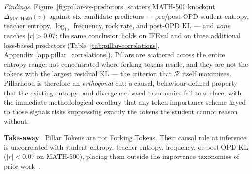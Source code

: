 \emph{Findings.} Figure~\ref{fig:pillar-vs-predictors} scatters MATH-500 knockout $\Delta_{\mathrm{MATH500}}(v)$ against six candidate predictors --- pre/post-OPD student entropy, teacher entropy, $\log_{10}$ frequency, rock rate, and post-OPD KL --- and \emph{none} reaches $|r|>0.07$; the same conclusion holds on IFEval and on three additional loss-based predictors (Table~\ref{tab:pillar-correlations}, Appendix~\ref{app:pillar_correlations}). Pillars are scattered across the entire entropy range, not concentrated where forking tokens reside, and they are not the tokens with the largest residual KL --- the criterion that $\mathcal{R}$ itself maximizes. Pillarhood is therefore an \emph{orthogonal} cut: a causal, behaviour-defined property that the existing entropy- and divergence-based taxonomies fail to surface, with the immediate methodological corollary that any token-importance scheme keyed to those signals risks suppressing exactly the tokens the student cannot reason without.

\begin{takeaway}
\textcolor{tabblue}{\textbf{Take-away}}~
Pillar Tokens are not Forking Tokens. Their causal role at inference is
uncorrelated with student entropy, teacher entropy, frequency, or
post-OPD KL ($|r| < 0.07$ on MATH-500), placing them outside the
importance taxonomies of prior work~\cite{wangbeyond,tip2026}.
\end{takeaway}

